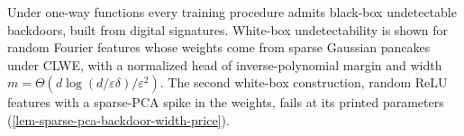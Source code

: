 \begin{borrowed}
Under one-way functions every training procedure admits black-box undetectable
backdoors, built from digital signatures. White-box undetectability is shown for random
Fourier features whose weights come from sparse Gaussian pancakes under CLWE, with a
normalized head of inverse-polynomial margin and width
$m=\Theta(d\log(d/\varepsilon\delta)/\varepsilon^2)$. The second white-box construction,
random ReLU features with a sparse-PCA spike in the weights, fails at its printed
parameters (\cref{lem-sparse-pca-backdoor-width-price}).
\end{borrowed}
